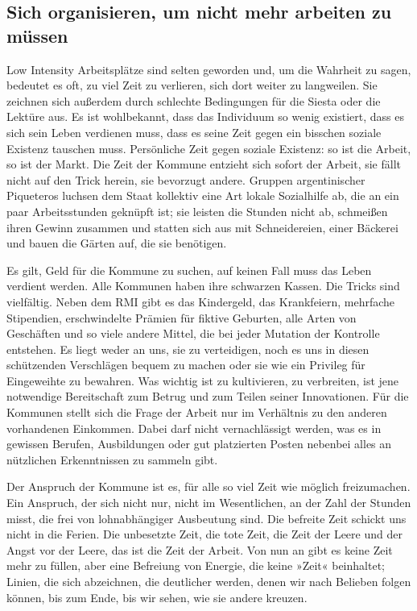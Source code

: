 \subsection{Sich organisieren, um nicht mehr arbeiten zu müssen}

Low Intensity Arbeitsplätze sind selten geworden und, um die
Wahrheit zu sagen, bedeutet es oft, zu viel Zeit zu verlieren, sich
dort weiter zu langweilen. Sie zeichnen sich außerdem durch
schlechte Bedingungen für die Siesta oder die Lektüre aus.
Es ist wohlbekannt, dass das Individuum so wenig existiert, dass es
sich sein Leben verdienen muss, dass es seine Zeit gegen ein
bisschen soziale Existenz tauschen muss. Persönliche Zeit gegen
soziale Existenz: so ist die Arbeit, so ist der Markt. Die Zeit der
Kommune entzieht sich sofort der Arbeit, sie fällt nicht auf den
Trick herein, sie bevorzugt andere. Gruppen argentinischer
Piqueteros luchsen dem Staat kollektiv eine Art lokale Sozialhilfe
ab, die an ein paar Arbeitsstunden geknüpft ist; sie leisten die
Stunden nicht ab, schmeißen ihren Gewinn zusammen und statten sich
aus mit Schneidereien, einer Bäckerei und bauen die Gärten auf, die
sie benötigen.

Es gilt, Geld für die Kommune zu suchen, auf keinen Fall muss das
Leben verdient werden. Alle Kommunen haben ihre schwarzen Kassen.
Die Tricks sind vielfältig. Neben dem RMI gibt es das Kindergeld,
das Krankfeiern, mehrfache Stipendien, erschwindelte Prämien für
fiktive Geburten, alle Arten von Geschäften und so viele andere
Mittel, die bei jeder Mutation der Kontrolle entstehen. Es liegt
weder an uns, sie zu verteidigen, noch es uns in diesen schützenden
Verschlägen bequem zu machen oder sie wie ein Privileg für
Eingeweihte zu bewahren. Was wichtig ist zu kultivieren, zu
verbreiten, ist jene notwendige Bereitschaft zum Betrug und zum
Teilen seiner Innovationen. Für die Kommunen stellt sich die Frage
der Arbeit nur im Verhältnis zu den anderen vorhandenen Einkommen.
Dabei darf nicht vernachlässigt werden, was es in gewissen Berufen,
Ausbildungen oder gut platzierten Posten nebenbei alles an
nützlichen Erkenntnissen zu sammeln gibt.

\extrapar{}

Der Anspruch der Kommune ist es, für alle so viel Zeit wie möglich
freizumachen. Ein Anspruch, der sich nicht nur, nicht im
Wesentlichen, an der Zahl der Stunden misst, die frei von
lohnabhängiger Ausbeutung sind. Die befreite Zeit schickt uns nicht
in die Ferien. Die unbesetzte Zeit, die tote Zeit, die Zeit der
Leere und der Angst vor der Leere, das ist die Zeit der Arbeit. Von
nun an gibt es keine Zeit mehr zu füllen, aber eine Befreiung von
Energie, die keine »Zeit« beinhaltet; Linien, die sich abzeichnen,
die deutlicher werden, denen wir nach Belieben folgen können, bis
zum Ende, bis wir sehen, wie sie andere kreuzen.

